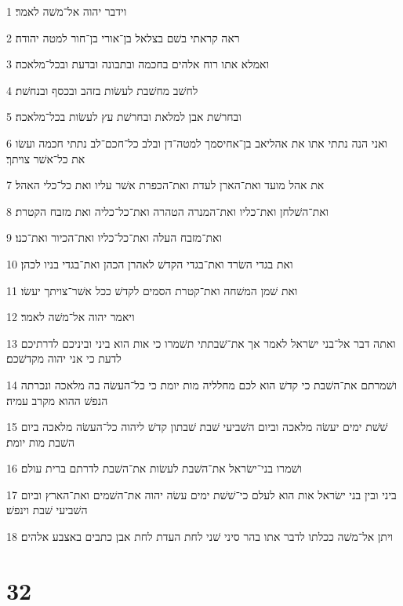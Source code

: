\par 1 וידבר יהוה אל־משׁה לאמר׃
\par 2 ראה קראתי בשׁם בצלאל בן־אורי בן־חור למטה יהודה׃
\par 3 ואמלא אתו רוח אלהים בחכמה ובתבונה ובדעת ובכל־מלאכה׃
\par 4 לחשׁב מחשׁבת לעשׂות בזהב ובכסף ובנחשׁת׃
\par 5 ובחרשׁת אבן למלאת ובחרשׁת עץ לעשׂות בכל־מלאכה׃
\par 6 ואני הנה נתתי אתו את אהליאב בן־אחיסמך למטה־דן ובלב כל־חכם־לב נתתי חכמה ועשׂו את כל־אשׁר צויתך׃
\par 7 את אהל מועד ואת־הארן לעדת ואת־הכפרת אשׁר עליו ואת כל־כלי האהל׃
\par 8 ואת־השׁלחן ואת־כליו ואת־המנרה הטהרה ואת־כל־כליה ואת מזבח הקטרת׃
\par 9 ואת־מזבח העלה ואת־כל־כליו ואת־הכיור ואת־כנו׃
\par 10 ואת בגדי השׂרד ואת־בגדי הקדשׁ לאהרן הכהן ואת־בגדי בניו לכהן׃
\par 11 ואת שׁמן המשׁחה ואת־קטרת הסמים לקדשׁ ככל אשׁר־צויתך יעשׂו׃
\par 12 ויאמר יהוה אל־משׁה לאמר׃
\par 13 ואתה דבר אל־בני ישׂראל לאמר אך את־שׁבתתי תשׁמרו כי אות הוא ביני וביניכם לדרתיכם לדעת כי אני יהוה מקדשׁכם׃
\par 14 ושׁמרתם את־השׁבת כי קדשׁ הוא לכם מחלליה מות יומת כי כל־העשׂה בה מלאכה ונכרתה הנפשׁ ההוא מקרב עמיה׃
\par 15 שׁשׁת ימים יעשׂה מלאכה וביום השׁביעי שׁבת שׁבתון קדשׁ ליהוה כל־העשׂה מלאכה ביום השׁבת מות יומת׃
\par 16 ושׁמרו בני־ישׂראל את־השׁבת לעשׂות את־השׁבת לדרתם ברית עולם׃
\par 17 ביני ובין בני ישׂראל אות הוא לעלם כי־שׁשׁת ימים עשׂה יהוה את־השׁמים ואת־הארץ וביום השׁביעי שׁבת וינפשׁ׃
\par 18 ויתן אל־משׁה ככלתו לדבר אתו בהר סיני שׁני לחת העדת לחת אבן כתבים באצבע אלהים׃

\chapter{32}


